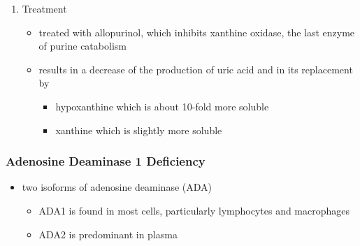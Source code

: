 \documentclass{scrartcl}
\begin{document}
\begin{enumerate}
\item Treatment
\label{sec:org75acb4b}
\begin{itemize}
\item treated with allopurinol, which inhibits xanthine oxidase, the last
enzyme of purine catabolism
\item results in a decrease of the production of uric acid and in its
replacement by
\begin{itemize}
\item hypoxanthine which is about 10-fold more soluble
\item xanthine which is slightly more soluble
\end{itemize}
\end{itemize}
\end{enumerate}

\subsubsection{Adenosine Deaminase 1 Deficiency}
\label{sec:orga6fb962}
\begin{itemize}
\item two isoforms of adenosine deaminase (ADA)
\begin{itemize}
\item ADA1 is found in most cells, particularly lymphocytes and macrophages
\item ADA2 is predominant in plasma
\end{itemize}
\end{itemize}
\end{document}
